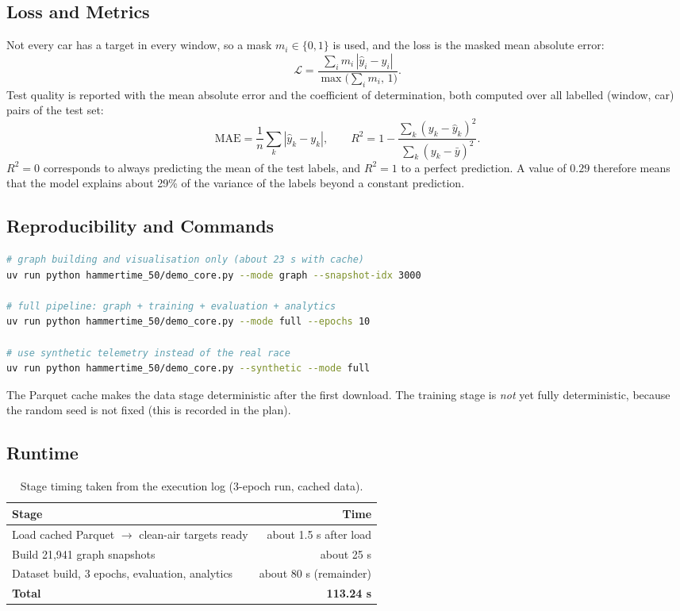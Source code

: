 \documentclass[11pt,a4paper]{article}
\begin{document}
\subsection{Loss and Metrics}
Not every car has a target in every window, so a mask $m_i \in \{0,1\}$ is
used, and the loss is the masked mean absolute error:
\begin{equation}
\mathcal{L} = \frac{\sum_i m_i\,|\hat{y}_i - y_i|}{\max\bigl(\sum_i m_i,\,1\bigr)}.
\end{equation}
Test quality is reported with the mean absolute error and the coefficient of
determination, both computed over all labelled (window, car) pairs of the test set:
\begin{equation}
\text{MAE} = \frac{1}{n}\sum_{k}|\hat{y}_k - y_k|, \qquad
R^2 = 1 - \frac{\sum_k (y_k-\hat{y}_k)^2}{\sum_k (y_k-\bar{y})^2}.
\end{equation}
$R^2=0$ corresponds to always predicting the mean of the test labels, and
$R^2=1$ to a perfect prediction. A value of $0.29$ therefore means that the
model explains about 29\% of the variance of the labels beyond a constant
prediction.

\subsection{Reproducibility and Commands}
\begin{lstlisting}[language=bash]
# graph building and visualisation only (about 23 s with cache)
uv run python hammertime_50/demo_core.py --mode graph --snapshot-idx 3000

# full pipeline: graph + training + evaluation + analytics
uv run python hammertime_50/demo_core.py --mode full --epochs 10

# use synthetic telemetry instead of the real race
uv run python hammertime_50/demo_core.py --synthetic --mode full
\end{lstlisting}
The Parquet cache makes the data stage deterministic after the first
download. The training stage is \emph{not} yet fully deterministic, because
the random seed is not fixed (this is recorded in the plan).

\subsection{Runtime}
\begin{table}[H]
\centering
\caption{Stage timing taken from the execution log (3-epoch run, cached data).}
\label{tab:runtime}
\small
\begin{tabular}{@{}lr@{}}
\toprule
\textbf{Stage} & \textbf{Time} \\
\midrule
Load cached Parquet $\to$ clean-air targets ready & about 1.5 s after load \\
Build 21{,}941 graph snapshots & about 25 s \\
Dataset build, 3 epochs, evaluation, analytics & about 80 s (remainder) \\
\textbf{Total} & \textbf{113.24 s} \\
\bottomrule
\end{tabular}
\end{table}
\end{document}
